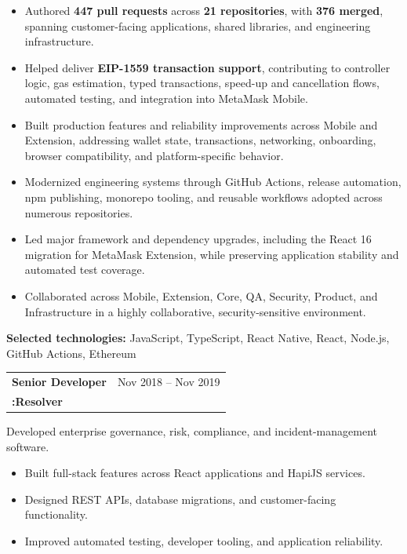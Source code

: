\documentclass[10pt,letterpaper]{article}
\makeatletter
\newcommand{\headingfont}{\plexmono}
\newcommand{\role}[3]{%
  \begin{tabularx}{\textwidth}{@{}X r@{}}
    {\headingfont\bfseries\large #1} & {\headingfont\small\color{muted} #3}\\[-1pt]
    {\headingfont\bfseries\color{tealink} #2} &
  \end{tabularx}\vspace{0.5pt}
}
\makeatother
\begin{document}
\begin{itemize}

  \item Authored \textbf{447 pull requests} across \textbf{21 repositories}, with \textbf{376 merged}, spanning customer-facing applications, shared libraries, and engineering infrastructure.

  \item Helped deliver \textbf{EIP-1559 transaction support}, contributing to controller logic, gas estimation, typed transactions, speed-up and cancellation flows, automated testing, and integration into MetaMask Mobile.

  \item Built production features and reliability improvements across Mobile and Extension, addressing wallet state, transactions, networking, onboarding, browser compatibility, and platform-specific behavior.

  \item Modernized engineering systems through GitHub Actions, release automation, npm publishing, monorepo tooling, and reusable workflows adopted across numerous repositories.

  \item Led major framework and dependency upgrades, including the React 16 migration for MetaMask Extension, while preserving application stability and automated test coverage.

  \item Collaborated across Mobile, Extension, Core, QA, Security, Product, and Infrastructure in a highly collaborative, security-sensitive environment.

\end{itemize}

\textbf{Selected technologies:} JavaScript, TypeScript, React Native, React, Node.js, GitHub Actions, Ethereum

\vspace{4pt}

\role{Senior Developer}{:Resolver}{Nov 2018 -- Nov 2019}

Developed enterprise governance, risk, compliance, and incident-management software.

\begin{itemize}

  \item Built full-stack features across React applications and HapiJS services.

  \item Designed REST APIs, database migrations, and customer-facing functionality.

  \item Improved automated testing, developer tooling, and application reliability.

\end{itemize}
\end{document}

